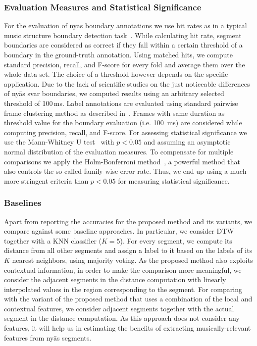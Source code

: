 {\subsubsection{Evaluation Measures and Statistical Significance}

For the evaluation of ny\={a}s boundary annotations we use hit rates as in a typical music structure boundary detection task~\cite{Ong05ICMC}. While calculating hit rate, segment boundaries are considered as correct if they fall within a certain threshold of a boundary in the ground-truth annotation. Using matched hits, we compute standard precision, recall, and F-score for every fold and average them over the whole data set. The choice of a threshold however depends on the specific application. Due to the lack of scientific studies on the just noticeable differences of ny\={a}s svar boundaries, we computed results using an arbitrary selected threshold of 100\,ms. Label annotations are evaluated using standard pairwise frame clustering method as described in~\cite{levy2008structural}. Frames with same duration as threshold value for the boundary evaluation (i.e. 100~ms) are considered while computing precision, recall, and F-score. For assessing statistical significance we use the Mann-Whitney U test~\cite{mann1947test} with $p<0.05$ and assuming an asymptotic normal distribution of the evaluation measures. To compensate for multiple comparisons we apply the Holm-Bonferroni method~\cite{holm1979simple}, a powerful method that also controls the so-called family-wise error rate. Thus, we end up using a much more stringent criteria than $p<0.05$ for measuring statistical significance.

\subsubsection{Baselines}

Apart from reporting the accuracies for the proposed method and its variants, we compare against some baseline approaches. In particular, we consider DTW together with a KNN classifier ($K=5$). For every segment, we compute its distance from all other segments and assign a label to it based on the labels of its $K$ nearest neighbors, using majority voting. As the proposed method also exploits contextual information, in order to make the comparison more meaningful, we consider the adjacent segments in the distance computation with linearly interpolated values in the region corresponding to the segment. For comparing with the variant of the proposed method that uses a combination of the local and contextual features, we consider adjacent segments together with the actual segment in the distance computation. As this approach does not consider any features, it will help us in estimating the benefits of extracting musically-relevant features from ny\={a}s segments. 

}
